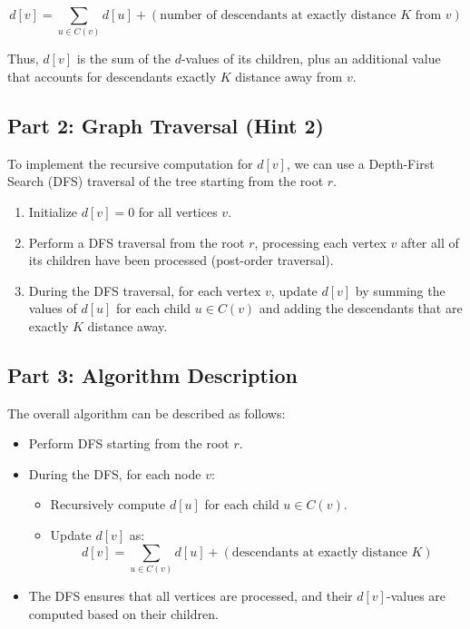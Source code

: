 \documentclass[11pt]{article}
\begin{document}
\[
d[v] = \sum_{u \in C(v)} d[u] + \left( \text{number of descendants at exactly distance } K \text{ from } v \right)
\]

Thus, \( d[v] \) is the sum of the \( d \)-values of its children, plus an additional value that accounts for descendants exactly \( K \) distance away from \( v \).

\subsection*{Part 2: Graph Traversal (Hint 2)}
To implement the recursive computation for \( d[v] \), we can use a Depth-First Search (DFS) traversal of the tree starting from the root \( r \).

\begin{enumerate}
    \item Initialize \( d[v] = 0 \) for all vertices \( v \).
    \item Perform a DFS traversal from the root \( r \), processing each vertex \( v \) after all of its children have been processed (post-order traversal).
    \item During the DFS traversal, for each vertex \( v \), update \( d[v] \) by summing the values of \( d[u] \) for each child \( u \in C(v) \) and adding the descendants that are exactly \( K \) distance away.
\end{enumerate}

\subsection*{Part 3: Algorithm Description}

The overall algorithm can be described as follows:

\begin{itemize}
    \item Perform DFS starting from the root \( r \).
    \item During the DFS, for each node \( v \):
    \begin{itemize}
        \item Recursively compute \( d[u] \) for each child \( u \in C(v) \).
        \item Update \( d[v] \) as:
        \[
        d[v] = \sum_{u \in C(v)} d[u] + \left( \text{descendants at exactly distance } K \right)
        \]
    \end{itemize}
    \item The DFS ensures that all vertices are processed, and their \( d[v] \)-values are computed based on their children.
\end{itemize}
\end{document}
